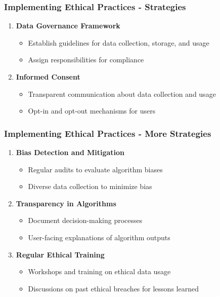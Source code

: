 \documentclass[aspectratio=169]{beamer}
\begin{document}
\begin{frame}[fragile]
    \frametitle{Implementing Ethical Practices - Strategies}
    \begin{enumerate}
        \item \textbf{Data Governance Framework}
        \begin{itemize}
            \item Establish guidelines for data collection, storage, and usage
            \item Assign responsibilities for compliance
        \end{itemize}

        \item \textbf{Informed Consent}
        \begin{itemize}
            \item Transparent communication about data collection and usage
            \item Opt-in and opt-out mechanisms for users
        \end{itemize}
    \end{enumerate}
\end{frame}

\begin{frame}[fragile]
    \frametitle{Implementing Ethical Practices - More Strategies}
    \begin{enumerate}[resume]
        \item \textbf{Bias Detection and Mitigation}
        \begin{itemize}
            \item Regular audits to evaluate algorithm biases
            \item Diverse data collection to minimize bias
        \end{itemize}

        \item \textbf{Transparency in Algorithms}
        \begin{itemize}
            \item Document decision-making processes
            \item User-facing explanations of algorithm outputs
        \end{itemize}

        \item \textbf{Regular Ethical Training}
        \begin{itemize}
            \item Workshops and training on ethical data usage
            \item Discussions on past ethical breaches for lessons learned
        \end{itemize}
    \end{enumerate}
\end{frame}
\end{document}
